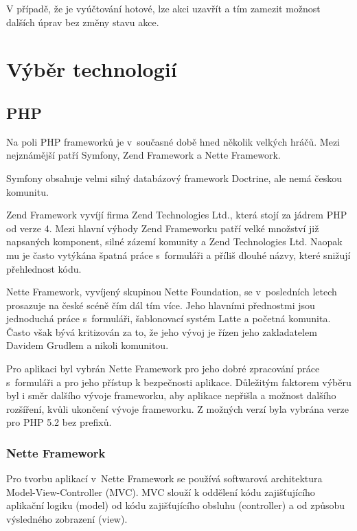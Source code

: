 \documentclass[thesis=B,czech]{FITthesis}[2012/04/27]
\begin{document}
V případě, že je vyúčtování hotové, lze akci uzavřít a tím zamezit možnost dalších úprav bez změny stavu akce.

\section{Výběr technologií}
\subsection{PHP}
Na poli PHP frameworků je v~současné době hned několik velkých hráčů. Mezi nejznámější patří Symfony, Zend Framework a Nette Framework.

Symfony obsahuje velmi silný databázový framework Doctrine, ale nemá českou komunitu.

Zend Framework vyvíjí firma Zend Technologies Ltd., která stojí za jádrem PHP od verze 4. Mezi hlavní výhody Zend Frameworku patří velké množství již napsaných komponent, silné zázemí komunity a Zend Technologies Ltd. Naopak mu je často vytýkána špatná práce s~formuláři a příliš dlouhé názvy, které snižují přehlednost kódu. 

Nette Framework, vyvíjený skupinou Nette Foundation, se v~posledních letech prosazuje na české scéně čím dál tím více. Jeho hlavními přednostmi jsou jednoduchá práce s~formuláři, šablonovací systém Latte a početná komunita. Často však bývá kritizován za to, že jeho vývoj je řízen jeho zakladatelem Davidem Grudlem a nikoli komunitou.

Pro aplikaci byl vybrán Nette Framework pro jeho dobré zpracování práce s~formuláři a pro jeho přístup k bezpečnosti aplikace. Důležitým faktorem výběru byl i směr dalšího vývoje frameworku, aby aplikace nepřišla a možnost dalšího rozšíření, kvůli ukončení vývoje frameworku. Z možných verzí byla vybrána verze pro PHP 5.2 bez prefixů.

\subsubsection*{Nette Framework}\label{netteDescription}
Pro tvorbu aplikací v~Nette Framework se používá softwarová architektura Model-View-Controller (MVC). MVC slouží k oddělení kódu zajišťujícího aplikační logiku (model) od kódu zajišťujícího obsluhu (controller) a od způsobu výsledného zobrazení (view).

\cite{netteModel}
\end{document}
